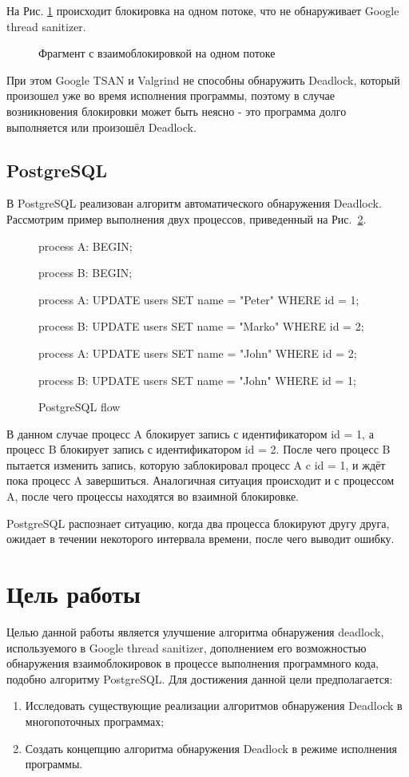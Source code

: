 \documentclass[runningheads, extrasrussian]{llncs}
\begin{document}
На Рис. \ref{fig:1m1t-d} происходит блокировка на одном потоке, что не обнаруживает Google thread sanitizer.

\begin{figure}[htbp]

 \caption{Фрагмент с взаимоблокировкой на одном потоке}%
 \label{fig:1m1t-d}
\end{figure}

При этом Google TSAN и Valgrind не способны обнаружить Deadlock, который произошел уже во время исполнения программы, поэтому в случае возникновения блокировки может быть неясно - это программа долго выполняется или произошёл Deadlock.

\subsection{PostgreSQL} 
В PostgreSQL реализован алгоритм автоматического обнаружения Deadlock\cite{ref_postgre_deadlock}. Рассмотрим пример выполнения двух процессов, приведенный на Рис.~\ref{fig:postgre-flow}.

\begin{figure}[h]
process A: BEGIN;

process B: BEGIN;

process A: UPDATE users SET name = "Peter" WHERE id = 1;

process B: UPDATE users SET name = "Marko" WHERE id = 2;

process A: UPDATE users SET name = "John" WHERE id = 2;

process B: UPDATE users SET name = "John" WHERE id = 1;
\caption{PostgreSQL flow} 
\label{fig:postgre-flow}
\end{figure}

В данном случае процесс A блокирует запись с идентификатором id = 1, а процесс B блокирует запись с идентификатором id = 2. После чего процесс B пытается изменить запись, которую заблокировал процесс A c id = 1, и ждёт пока процесс A завершиться. Аналогичная ситуация происходит и с процессом A, после чего процессы находятся во взаимной блокировке.

PostgreSQL распознает ситуацию, когда два процесса блокируют другу друга, ожидает в течении некоторого интервала времени, после чего выводит ошибку.

\section{Цель работы}

Целью данной работы является улучшение алгоритма обнаружения deadlock, используемого в Google thread sanitizer, дополнением его возможностью обнаружения взаимоблокировок в процессе выполнения программного кода, подобно алгоритму PostgreSQL. Для достижения данной цели предполагается: 
\begin{enumerate}
\item Исследовать существующие реализации алгоритмов обнаружения Deadlock в многопоточных программах;
\item Создать концепцию алгоритма обнаружения Deadlock в режиме исполнения программы.
\end{enumerate}
\end{document}
